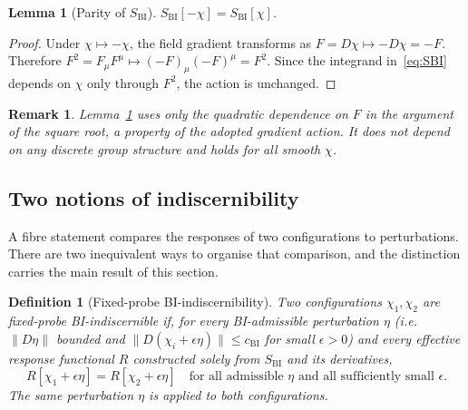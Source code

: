 \documentclass[11pt,a4paper]{article}
\newtheorem{lemma}[theorem]{Lemma}
\newtheorem{definition}[theorem]{Definition}
\newtheorem{remark}[theorem]{Remark}
\newcommand{\chifield}{\chi}
\newcommand{\cchi}{c_{\mathrm{BI}}}
\begin{document}
    \begin{lemma}[Parity of $S_{\mathrm{BI}}$]
      \label{lem:parity}
      $S_{\mathrm{BI}}[-\chifield] = S_{\mathrm{BI}}[\chifield]$.
    \end{lemma}

    \begin{proof}
      Under $\chifield \mapsto -\chifield$, the field gradient transforms as
      $F = D\chifield \mapsto -D\chifield = -F$.
      Therefore $F^{2} = F_{\mu}F^{\mu} \mapsto (-F)_{\mu}(-F)^{\mu} = F^{2}$.
      Since the integrand in~\eqref{eq:SBI} depends on $\chifield$ only through $F^{2}$,
      the action is unchanged.
    \end{proof}

    \begin{remark}
      Lemma~\ref{lem:parity} uses only the quadratic dependence on $F$ in the argument of the
      square root, a property of the adopted gradient action.
      It does not depend on any discrete group structure and holds for all smooth $\chifield$.
    \end{remark}

  \subsection{Two notions of indiscernibility}
    \label{ssec:indiscern}

    A fibre statement compares the responses of two configurations to perturbations.
    There are two inequivalent ways to organise that comparison, and the distinction carries
    the main result of this section.

    \begin{definition}[Fixed-probe BI-indiscernibility]
      \label{def:indiscern}
      Two configurations $\chifield_{1}, \chifield_{2}$ are \emph{fixed-probe
      BI-indiscernible} if, for every BI-admissible perturbation $\eta$ (i.e.\ $\|D\eta\|$
      bounded and $\|D(\chifield_{i} + \epsilon\eta)\| \leq \cchi$ for small
      $\epsilon > 0$) and every effective response functional $R$ constructed solely from
      $S_{\mathrm{BI}}$ and its derivatives,
      \begin{equation}
        R[\chifield_{1} + \epsilon\eta]
        = R[\chifield_{2} + \epsilon\eta]
        \quad\text{for all admissible } \eta \text{ and all sufficiently small } \epsilon.
        \label{eq:indiscern}
      \end{equation}
      The same perturbation $\eta$ is applied to both configurations.
    \end{definition}
\end{document}
